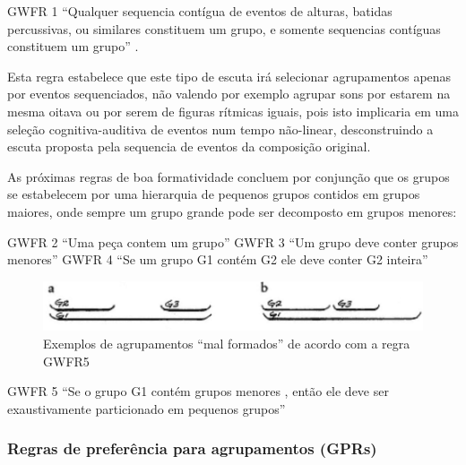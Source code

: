 \documentclass[
	12pt,				%
	openright,			%
	twoside,			%
	a4paper,			%
	english,			%
	french,				%
	spanish,			%
	brazil				%
	]{abntex2}
\begin{document}
\begin{citacao}
GWFR 1 “Qualquer sequencia contígua de eventos de alturas, batidas percussivas, ou similares constituem um grupo, e somente sequencias contíguas constituem um grupo” \cite[ pg.37]{lerdahl1983generative}.
\end{citacao}

Esta regra estabelece que este tipo de escuta irá selecionar agrupamentos apenas por eventos sequenciados, não valendo por exemplo agrupar sons por estarem na mesma oitava ou por serem de figuras rítmicas iguais, pois isto implicaria em uma seleção cognitiva-auditiva de eventos num tempo não-linear, desconstruindo a escuta proposta pela sequencia de eventos da composição original.

As próximas regras de boa formatividade concluem por conjunção que os grupos se estabelecem por uma hierarquia de pequenos grupos contidos em grupos maiores, onde sempre um grupo grande pode ser decomposto em grupos menores:


\begin{citacao}
GWFR 2 “Uma peça contem um grupo”\linebreak
GWFR 3 “Um grupo deve conter grupos menores”\linebreak
GWFR 4  “Se um grupo G1 contém G2 ele deve conter G2 inteira” 
 \cite[ p.38]{lerdahl1983generative}
\end{citacao}


\begin{figure}[htb]
	\caption{\label{fig_grafico}Exemplos de agrupamentos “mal formados” de acordo com a regra GWFR5}
	\begin{center}
	    \includegraphics[scale=0.35]{gttm/GWFR_fig33.png}
	\end{center}
\end{figure}




\begin{citacao}
GWFR 5 “Se o grupo G1 contém grupos menores , então ele deve ser exaustivamente particionado em pequenos grupos”
\cite[ p.38]{lerdahl1983generative}
\end{citacao}

\subsubsection{Regras de preferência para agrupamentos (GPRs)}
\end{document}
